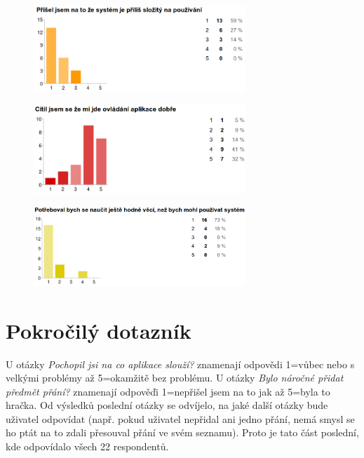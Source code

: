 \begin{figure}[H]
\begin{center}
\includegraphics[width=80mm]{./pictures/dotaznik/sus-08.png}
\label{fig:dot:sus-08}
\end{center}
\end{figure}

\begin{figure}[H]
\begin{center}
\includegraphics[width=80mm]{./pictures/dotaznik/sus-09.png}
\label{fig:dot:sus-09}
\end{center}
\end{figure}

\begin{figure}[H]
\begin{center}
\includegraphics[width=80mm]{./pictures/dotaznik/sus-10.png}
\label{fig:dot:sus-10}
\end{center}
\end{figure}

\section{Pokročilý dotazník}
U otázky \emph{Pochopil jsi na co aplikace slouží?} znamenají odpovědi 1=vůbec nebo s velkými problémy až 5=okamžitě bez problému. U otázky \emph{Bylo náročné přidat předmět přání?} znamenají odpověďi 1=nepřišel jsem na to jak až 5=byla to hračka.
Od výsledků poslední otázky se odvíjelo, na jaké další otázky bude uživatel odpovídat (např. pokud uživatel nepřidal ani jedno přání, nemá smysl se ho ptát na to zdali přesouval přání ve svém seznamu). Proto je tato část poslední, kde odpovídalo všech 22 respondentů.

